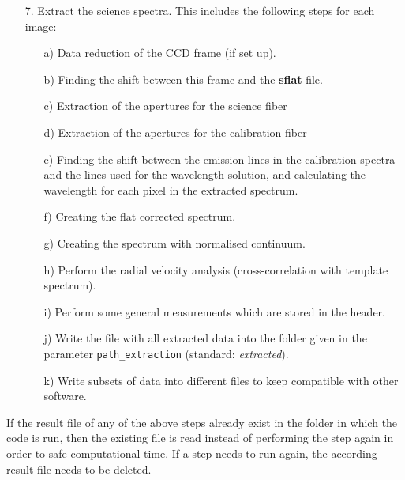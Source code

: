\documentclass[10pt,a4paper]{article}
\begin{document}
\begin{itemize}
  \item[7.] Extract the science spectra. This includes the following steps for each image:
  \begin{itemize}
    \item[a)] Data reduction of the CCD frame (if set up).
    \item[b)] Finding the shift between this frame and the \textbf{sflat} file.
    \item[c)] Extraction of the apertures for the science fiber
    \item[d)] Extraction of the apertures for the calibration fiber
    \item[e)] Finding the shift between the emission lines in the calibration spectra and the lines used for the wavelength solution, and calculating the wavelength for each pixel in the extracted spectrum.
    \item[f)] Creating the flat corrected spectrum.
    \item[g)] Creating the spectrum with normalised continuum.
    \item[h)] Perform the radial velocity analysis (cross-correlation with template spectrum).
    \item[i)] Perform some general measurements which are stored in the header.
    \item[j)] Write the file with all extracted data into the folder given in the parameter \verb|path_extraction| (standard: \textit{extracted}).
    \item[k)] Write subsets of data into different files to keep compatible with other software.
  \end{itemize}
\end{itemize}

\noindent If the result file of any of the above steps already exist in the folder in which the code is run, then the existing file is read instead of performing the step again in order to safe computational time. If a step needs to run again, the according result file needs to be deleted.
\end{document}
